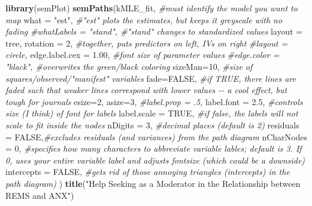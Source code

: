 \documentclass[
  11pt,
]{book}
\newenvironment{Shaded}{\begin{snugshade}}{\end{snugshade}}
\newcommand{\AttributeTok}[1]{\textcolor[rgb]{0.27,0.27,0.27}{#1}}
\newcommand{\CommentTok}[1]{\textcolor[rgb]{0.37,0.37,0.37}{\textit{#1}}}
\newcommand{\ConstantTok}[1]{\textcolor[rgb]{0.37,0.37,0.37}{#1}}
\newcommand{\DecValTok}[1]{\textcolor[rgb]{0.06,0.06,0.06}{#1}}
\newcommand{\FloatTok}[1]{\textcolor[rgb]{0.06,0.06,0.06}{#1}}
\newcommand{\FunctionTok}[1]{\textcolor[rgb]{0.27,0.27,0.27}{\textbf{#1}}}
\newcommand{\NormalTok}[1]{#1}
\newcommand{\StringTok}[1]{\textcolor[rgb]{0.5,0.5,0.5}{#1}}
\begin{document}
\begin{Shaded}
\begin{Highlighting}[]
\FunctionTok{library}\NormalTok{(semPlot)}
\FunctionTok{semPaths}\NormalTok{(kMLE\_fit, }\CommentTok{\#must identify the model you want to map}
         \AttributeTok{what =} \StringTok{"est"}\NormalTok{, }\CommentTok{\#"est" plots the estimates, but keeps it greyscale with no fading}
         \CommentTok{\#whatLabels = "stand", \#"stand" changes to standardized values}
         \AttributeTok{layout =} \StringTok{\textquotesingle{}tree\textquotesingle{}}\NormalTok{, }\AttributeTok{rotation =} \DecValTok{2}\NormalTok{, }\CommentTok{\#together, puts predictors on left, IVs on right }
         \CommentTok{\#layout = \textquotesingle{}circle\textquotesingle{},}
         \AttributeTok{edge.label.cex =} \FloatTok{1.00}\NormalTok{, }\CommentTok{\#font size of parameter values}
         \CommentTok{\#edge.color = "black", \#overwrites the green/black coloring}
         \AttributeTok{sizeMan=}\DecValTok{10}\NormalTok{, }\CommentTok{\#size of squares/observed/"manifest" variables}
         \AttributeTok{fade=}\ConstantTok{FALSE}\NormalTok{, }\CommentTok{\#if TRUE, there lines are faded such that weaker lines correspond with lower values {-}{-} a cool effect, but tough for journals}
         \AttributeTok{esize=}\DecValTok{2}\NormalTok{, }
         \AttributeTok{asize=}\DecValTok{3}\NormalTok{,}
         \CommentTok{\#label.prop = .5,}
         \AttributeTok{label.font =} \FloatTok{2.5}\NormalTok{, }\CommentTok{\#controls size (I think) of font for labels}
         \AttributeTok{label.scale =} \ConstantTok{TRUE}\NormalTok{, }\CommentTok{\#if false, the labels will not scale to fit inside the nodes}
         \AttributeTok{nDigits =} \DecValTok{3}\NormalTok{, }\CommentTok{\#decimal places (default is 2)}
         \AttributeTok{residuals =} \ConstantTok{FALSE}\NormalTok{,}\CommentTok{\#excludes residuals (and variances) from the path diagram}
         \AttributeTok{nCharNodes =} \DecValTok{0}\NormalTok{, }\CommentTok{\#specifies how many characters to abbreviate variable lables; default is 3.  If 0, uses your entire variable label and adjusts fontsize (which could be a downside)}
         \AttributeTok{intercepts =} \ConstantTok{FALSE}\NormalTok{, }\CommentTok{\#gets rid of those annoying triangles (intercepts) in the path diagram)}
\NormalTok{)}
\FunctionTok{title}\NormalTok{(}\StringTok{"Help Seeking as a Moderator in the Relationship between REMS and ANX"}\NormalTok{)}
\end{Highlighting}
\end{Shaded}
\end{document}
